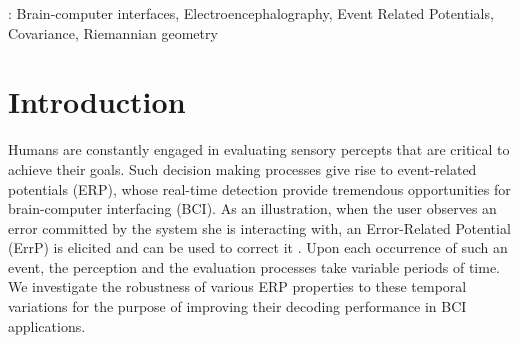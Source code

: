 \documentclass[12pt]{iopart}
\begin{document}
%
\vspace{2pc}
: Brain-computer interfaces, Electroencephalography, Event Related Potentials, Covariance, Riemannian geometry
%
%
% 
%




\section{Introduction}
\label{sec:intro}

Humans are constantly engaged in evaluating sensory percepts 
that are critical to achieve their goals. Such decision
making processes give rise to event-related potentials (ERP),
whose real-time detection
provide tremendous opportunities for brain-computer interfacing (BCI). 
As an illustration, when
the user observes an error committed by
the system she is interacting with, an Error-Related Potential (ErrP) is elicited
and can be used to correct it \cite{chavarriaga_adaptation_2010}.
Upon each occurrence of such an event, the perception 
and the evaluation processes take variable periods of time.
We investigate the robustness of various ERP properties to these temporal
variations for the purpose of improving their decoding performance in BCI applications.
\end{document}
